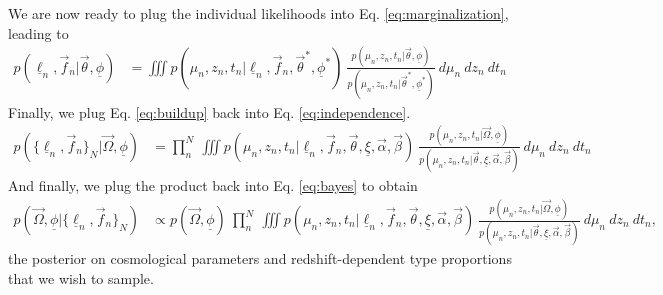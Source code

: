 \documentclass[12pt, onecolumn]{emulateapj}
\newcommand{\textul}{\underline}
\begin{document}
We are now ready to plug the individual likelihoods into Eq. \ref{eq:marginalization}, leading to
\begin{align}
\label{eq:buildup}
p(\textul{\ell}_{n}, \vec{f}_{n} | \vec{\theta}, \textul{\phi}) &= \iiint p(\mu_{n}, z_{n}, t_{n} | \textul{\ell}_{n}, \vec{f}_{n}, \vec{\theta}^{*}, \textul{\phi}^{*})\ \frac{p(\mu_{n}, z_{n}, t_{n} | \vec{\theta}, \textul{\phi})}{p(\mu_{n}, z_{n}, t_{n} | \vec{\theta}^{*}, \textul{\phi}^{*})}\ d\mu_{n}\ dz_{n}\ dt_{n}
\end{align}
Finally, we plug Eq. \ref{eq:buildup} back into Eq. \ref{eq:independence}.
\begin{align}
\label{eq:plugin}
p(\{\textul{\ell}_{n}, \vec{f}_{n}\}_{N} | \vec{\Omega}, \textul{\phi}) &= \prod_{n}^{N}\ \iiint p(\mu_{n}, z_{n}, t_{n} | \textul{\ell}_{n}, \vec{f}_{n}, \vec{\theta}, \textul{\xi}, \vec{\alpha}, \vec{\beta})\ \frac{p(\mu_{n}, z_{n}, t_{n} | \vec{\Omega}, \textul{\phi})}{p(\mu_{n}, z_{n}, t_{n} | \vec{\theta}, \textul{\xi}, \vec{\alpha}, \vec{\beta})}\ d\mu_{n}\ dz_{n}\ dt_{n}
\end{align}
And finally, we plug the product back into Eq. \ref{eq:bayes} to obtain
\begin{align}
\label{eq:wrapup}
p(\vec{\Omega}, \textul{\phi} | \{\textul{\ell}_{n}, \vec{f}_{n}\}_{N}) &\propto p(\vec{\Omega}, \textul{\phi})\ \prod_{n}^{N}\ \iiint p(\mu_{n}, z_{n}, t_{n} | \textul{\ell}_{n}, \vec{f}_{n}, \vec{\theta}, \textul{\xi}, \vec{\alpha}, \vec{\beta})\ \frac{p(\mu_{n}, z_{n}, t_{n} | \vec{\Omega}, \textul{\phi})}{p(\mu_{n}, z_{n}, t_{n} | \vec{\theta}, \textul{\xi}, \vec{\alpha}, \vec{\beta})}\ d\mu_{n}\ dz_{n}\ dt_{n},
\end{align}
the posterior on cosmological parameters and redshift-dependent type proportions that we wish to sample.
\end{document}
